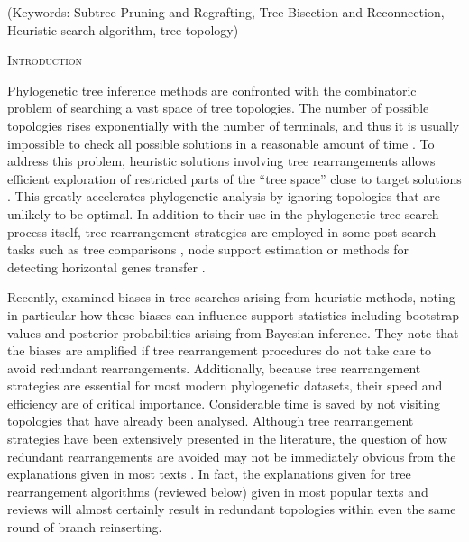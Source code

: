 \documentclass[12pt,letterpaper]{article}
\renewcommand{\section}[1]{%
\bigskip
\begin{center}
\begin{Large}
\normalfont\scshape #1
\medskip
\end{Large}
\end{center}}
\begin{document}
\noindent (Keywords: Subtree Pruning and Regrafting, Tree Bisection and Reconnection, Heuristic search algorithm, tree topology)\\

\vspace{1.5in}

\newpage 

%
%
\section{Introduction}

Phylogenetic tree inference methods are confronted with the combinatoric problem of searching a vast space of tree topologies. 
The number of possible topologies rises exponentially with the number of terminals, and thus it is usually impossible to check all possible solutions in a reasonable amount of time \citep{Felsenstein:1978vh}.
To address this problem, heuristic solutions involving tree rearrangements allows efficient exploration of restricted parts of the ``tree space'' close to target solutions \citep{john2016review}.
This greatly accelerates phylogenetic analysis by ignoring topologies that are unlikely to be optimal.
In addition to their use in the phylogenetic tree search process itself, tree rearrangement strategies are employed in some post-search tasks such as tree comparisons \citep[e.g.][]{allen2001subtree,kuhner2015treComparison}, node support estimation \citep[e.g.][]{goloboff2014bias} or methods for detecting horizontal genes transfer \citep[e.g.][]{mcfadden1995something,bordewich2005computational}.

Recently, \citet{goloboff2014bias} examined biases in tree searches arising from heuristic methods, noting in particular how these biases can influence support statistics including bootstrap values and posterior probabilities arising from Bayesian inference.
They note that the biases are amplified if tree rearrangement %
procedures do not take care to avoid redundant rearrangements. %
Additionally, because tree rearrangement strategies are essential for most modern phylogenetic datasets, their speed and efficiency are of critical importance.
Considerable time is saved by not visiting topologies that have already been analysed.
Although tree rearrangement strategies have been extensively presented in the literature, the question of how redundant rearrangements are avoided may not be immediately obvious from the explanations given in most texts \citep{swofford2003phylogeny,felsenstein2004inferring,wiley2011phylogenetics}.
In fact, the explanations given for tree rearrangement algorithms (reviewed below) given in most popular texts and reviews will almost certainly result in redundant topologies within even the same round of branch reinserting.
\end{document}
